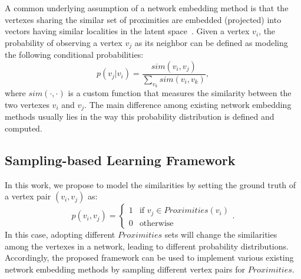 
A common underlying assumption of a network embedding method is that the vertexes sharing the similar set of proximities are embedded (projected) into vectors having similar localities in the latent space~\cite{line,dw,hpe,n2v,wl,grarep}. Given a vertex $v_{i}$, the probability of observing a vertex $v_{j}$ as its neighbor can be defined as modeling the following conditional probabilities:
\begin{equation}
    p(v_{j}|v_{i}) = \frac{sim(v_{i}, v_{j})}{\sum_{v_{k}}{sim(v_{i},v_{k})}},
    \label{eq:context}
\end{equation}
where $sim(\cdot,\cdot)$ is a custom function that measures the similarity between the two vertexes $v_{i}$ and $v_{j}$. The main difference among existing network embedding methods usually lies in the way this probability distribution is defined and computed.


\subsection{Sampling-based Learning Framework}

In this work, we propose to model the similarities by setting the ground truth of a vertex pair $(v_{i}, v_{j})$ as:
\begin{equation}
    p(v_{i}, v_{j}) =
    \begin{cases}
        1 & \text{if } v_{j} \in Proximities(v_{i}) \\
        0 & \text{otherwise}
    \end{cases}.
    \label{eq:gt}
\end{equation}
In this case, adopting different $Proximities$ sets will change the similarities among the vertexes in a network, leading to different probability distributions.  
Accordingly, the proposed framework can be used to implement various existing network embedding methods by sampling different vertex pairs for $Proximities$.

